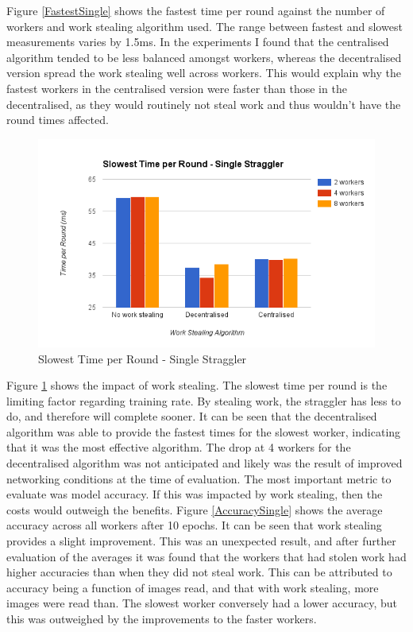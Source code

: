\documentclass[12pt]{article}
\begin{document}
Figure \ref{FastestSingle} shows the fastest time per round against the number of workers and work stealing algorithm used. The range between fastest and slowest measurements varies by 1.5ms. In the experiments I found that the centralised algorithm tended to be less balanced amongst workers, whereas the decentralised version spread the work stealing well across workers. This would explain why the fastest workers in the centralised version were faster than those in the decentralised, as they would routinely not steal work and thus wouldn't have the round times affected.

\begin{figure}[H]
  \centering
  \includegraphics[width=6in]{SlowestSingle}
  \caption[]{Slowest Time per Round - Single Straggler}
  \label{SlowestSingle}
\end{figure}

Figure \ref{SlowestSingle} shows the impact of work stealing. The slowest time per round is the limiting factor regarding training rate. By stealing work, the straggler has less to do, and therefore will complete sooner. It can be seen that the decentralised algorithm was able to provide the fastest times for the slowest worker, indicating that it was the most effective algorithm. The drop at 4 workers for the decentralised algorithm was not anticipated and likely was the result of improved networking conditions at the time of evaluation.
\newline
\newline
\newline
The most important metric to evaluate was model accuracy. If this was impacted by work stealing, then the costs would outweigh the benefits. Figure \ref{AccuracySingle} shows the average accuracy across all workers after 10 epochs. It can be seen that work stealing provides a slight improvement. This was an unexpected result, and after further evaluation of the averages it was found that the workers that had stolen work had higher accuracies than when they did not steal work. This can be attributed to accuracy being a function of images read, and that with work stealing, more images were read than. The slowest worker conversely had a lower accuracy, but this was outweighed by the improvements to the faster workers.
\end{document}
